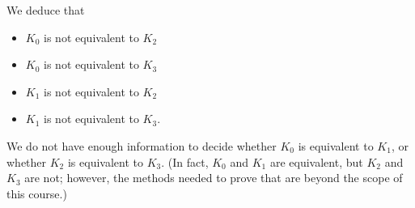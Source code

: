 \documentclass[a4paper]{amsart}
\begin{document}
\begin{solution}
 We deduce that 
 \begin{itemize}
  \item $K_0$ is not equivalent to $K_2$ 
  \item $K_0$ is not equivalent to $K_3$ 
  \item $K_1$ is not equivalent to $K_2$ 
  \item $K_1$ is not equivalent to $K_3$.
 \end{itemize}
 We do not have enough information to decide whether $K_0$ is
 equivalent to $K_1$, or whether $K_2$ is equivalent to $K_3$.  (In
 fact, $K_0$ and $K_1$ are equivalent, but $K_2$ and $K_3$ are not;
 however, the methods needed to prove that are beyond the scope of this
 course.) 
 \vspace{3ex}
\end{solution}
\vspace{-3ex}
\end{document}
